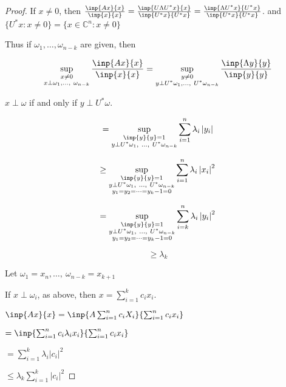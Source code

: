 \documentclass[twofold]{article}
\newcommand*\adj[1]{#1^*}
\newcommand*\abs[1]{\left \vert #1 \right\vert}
\theoremstyle{plain}
\theoremstyle{definition}
\theoremstyle{remark}
\begin{document}
\begin{proof} If \(x \neq 0\), then \(\frac{\inp{Ax}{x}}{\inp{x}{x}} = \frac{\inp{U \Lambda \adj{U} x}{x}}{\inp{\adj{U} x}{ \adj{U} x}} \\
 = \frac{\inp{\Lambda \adj{U} x}{ \adj{U} x}}{\inp{\adj{U}x}{\adj{U}x}}\). and \( \{ \adj{U} x : x \neq 0\}  = \{ x \in \mathbb{C}^n : x \neq 0 \}\) 



Thus if \(\omega_1, \ldots , \omega_{n-k}\) are given, then 

\[ \sup_{\substack{x \neq 0 \\ x \perp \omega_1, \ldots, \ \omega_{n-k}}} \frac{\inp{Ax}{x}}{\inp{x}{x}} = \sup_{\substack{y \neq 0 \\ y \perp \adj{U}\omega_1, \ldots ,\ \adj{U} \omega_{n-k}}} \frac{\inp{\Lambda y}{y}}{\inp{y}{y}}\]

\(x \perp \omega\) if and only if \(y \perp \adj{U} \omega\). 

\[ = \sup_{\substack{\inp{y}{y} = 1 \\ y \perp \adj{U} \omega_1, \ \ldots , \ \adj{U}\omega_{n-k}}} \sum_{i = 1}^n \lambda_i \abs{y_i}\]

\[ \ge \sup_{\substack{\inp{y}{y} = 1 \\ y \perp \adj{U} \omega_1, \ \ldots , \ \adj{U}\omega_{n-k} \\ y_1 = y_2 = \cdots = y_k-1 = 0 }} \sum_{i = 1}^n \lambda_i \abs{x_i}^2\]

\[ = \sup_{\substack{\inp{y}{y} = 1 \\ y \perp \adj{U} \omega_1, \ \ldots , \ \adj{U}\omega_{n-k} \\ y_1 = y_2 = \cdots = y_k-1 = 0 }} \sum_{i = k}^n \lambda_i \abs{y_i}^2\]

\[ \ge \lambda_k \]


Let \(\omega_1 = x_n , \ldots , \ \omega_{n-k} = x_{k + 1}\)

If \(x\perp \omega_i\), as above, then \(x = \sum_{i = 1} ^k c_i x_i\). 

\(\inp{Ax}{x} = \inp{A \sum_{i = 1} ^ n c_i X_i}{ \sum_{i = 1} ^n c_i x_i}\)

\( = \inp{\sum_{i = 1} ^n c_i \lambda_i x_i}{\sum_{i = 1} ^n c_i x_i}\)

\(= \sum_{i = 1} ^ k \lambda_i \abs{c_i}^2\) 

\( \le \lambda_k \sum_{i = 1} ^{k} \abs{c_i}^2\)


\end{proof}
\end{document}
